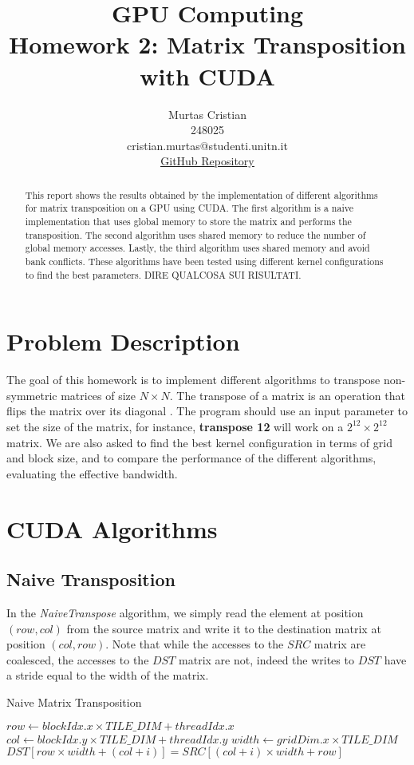 \documentclass[]{IEEEconf}
\title{\textbf{GPU Computing} \\
    \large Homework 2: Matrix Transposition with CUDA\\
}
\author{Murtas Cristian \\ 248025 \\ cristian.murtas@studenti.unitn.it \\
\underline{\href{https://github.com/SecondarySkyler/gpu-computing/tree/main/matrix_transposition}{GitHub Repository}}
}
\begin{document}
\maketitle
\nocite{*}

\begin{abstract}
This report shows the results obtained by the implementation of different algorithms for matrix transposition
on a GPU using CUDA. The first algorithm is a naive implementation that uses global memory to store the matrix
and performs the transposition. The second algorithm uses shared memory to reduce the number of global memory accesses.
Lastly, the third algorithm uses shared memory and avoid bank conflicts. These algorithms have been tested using different
kernel configurations to find the best parameters. DIRE QUALCOSA SUI RISULTATI.
\end{abstract}
\section{Problem Description}
The goal of this homework is to implement different algorithms to transpose non-symmetric matrices of size $N \times N$.
The transpose of a matrix is an operation that flips the matrix over its diagonal \cite{wiki:transposition}.
The program should use an input parameter to set the size of the matrix, for instance, \textbf{transpose 12} will work on a 
$2^{12} \times 2^{12}$ matrix. 
We are also asked to find the best kernel configuration in terms of grid and block size, and to compare the performance 
of the different algorithms, evaluating the effective bandwidth.
\section{CUDA Algorithms}
\subsection{Naive Transposition}
In the \textit{NaiveTranspose} algorithm, we simply read the element at position $(row, col)$ from the source matrix and write it to the destination matrix at position $(col, row)$.
Note that while the accesses to the $SRC$ matrix are coalesced, the accesses to the $DST$ matrix are not, indeed the writes to $DST$ have a stride equal
to the width of the matrix.
\begin{algorithm}
    \caption{Naive Matrix Transposition}
    \begin{algorithmic}[1]
            \State $row \gets blockIdx.x \times TILE\_DIM + threadIdx.x$
            \State $col \gets blockIdx.y \times TILE\_DIM + threadIdx.y$
            \State $width \gets gridDim.x \times TILE\_DIM$
                \State $DST[row \times width + (col + i)] = SRC[(col + i) \times width + row]$
            \EndFor
        \EndProcedure
    \end{algorithmic}
\end{algorithm}
\end{document}
